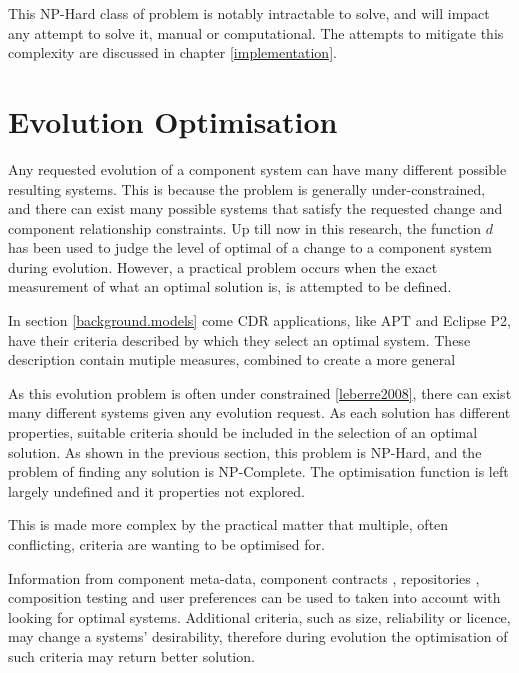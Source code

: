 This NP-Hard class of problem is notably intractable to solve, and will impact any attempt to solve it, manual or computational.
The attempts to mitigate this complexity are discussed in chapter \ref{implementation}.

\section{Evolution Optimisation}
\label{formal.opt}
Any requested evolution of a component system can have many different possible resulting systems.
This is because the problem is generally under-constrained, and there can exist many possible systems that satisfy the requested change and component relationship constraints.
Up till now in this research, the function $d$ has been used to judge the level of optimal of a change to a component system during evolution.
However, a practical problem occurs when the exact measurement of what an optimal solution is, is attempted to be defined. 

In section \ref{background.models} come CDR applications, like APT and Eclipse P2, have their criteria described by which they select an optimal system.
These description contain mutiple measures, combined to create a more general 

As this evolution problem is often under constrained \ref{leberre2008}, there can exist many different systems given any evolution request.
As each solution has different properties, suitable criteria should be included in the selection of an optimal solution.
As shown in the previous section, this problem is NP-Hard, and the problem of finding any solution is NP-Complete.
The optimisation function  is left largely undefined and it properties not explored.

This is made more complex by the practical matter that multiple, often conflicting, criteria are wanting to be optimised for.  

Information from component meta-data, component contracts \cite{Watkins1999}, repositories \cite{Guo2000}, 
composition testing \cite{XuejieZhang2008} and user preferences can be used to taken into account with looking for optimal systems.
Additional criteria, such as size, reliability or licence, may change a systems' desirability, 
therefore during evolution the optimisation of such criteria may return better solution.


